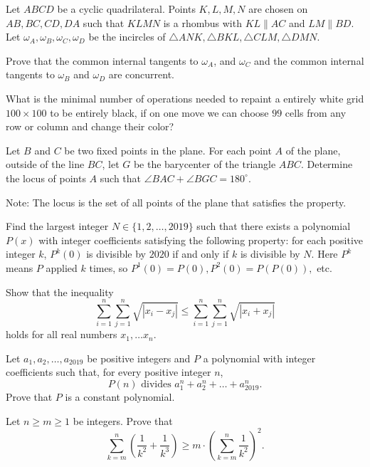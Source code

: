 \documentclass[11pt]{scrartcl}
\begin{document}
\begin{problem}[5299971832672937326]
Let $ABCD$ be a cyclic quadrilateral. Points $K, L, M, N$ are chosen on $AB, BC, CD, DA$ such that $KLMN$ is a rhombus with $KL \parallel AC$ and $LM \parallel BD$. Let $\omega_A, \omega_B, \omega_C, \omega_D$ be the incircles of $\triangle ANK, \triangle BKL, \triangle CLM, \triangle DMN$.

Prove that the common internal tangents to $\omega_A$, and $\omega_C$ and the common internal tangents to $\omega_B$ and $\omega_D$ are concurrent.
\end{problem}
\begin{problem}[549441013338848]
	What is the minimal number of operations needed to repaint a entirely white grid $100 \times 100$ to be entirely black, if on one move we can choose $99$ cells from any row or column and change their color?
\end{problem}
\begin{problem}[2143833415170817930]
Let $B$ and $C$ be two fixed points in the plane. For each point $A$ of the plane, outside of the line $BC$, let $G$ be the barycenter of the triangle $ABC$. Determine the locus of points $A$ such that $\angle BAC + \angle BGC = 180^{\circ}$.

Note: The locus is the set of all points of the plane that satisfies the property.
\end{problem}
\begin{problem}[4037864050528368034]
Find the largest integer $N \in \{1, 2, \ldots , 2019 \}$ such that there exists a polynomial $P(x)$ with integer coefficients satisfying the following property: for each positive integer $k$, $P^k(0)$ is divisible by $2020$ if and only if $k$ is divisible by $N$. Here $P^k$ means $P$ applied $k$ times, so $P^1(0)=P(0), P^2(0)=P(P(0)),$ etc.
\end{problem}
\begin{problem}[952584318797289]
Show that the inequality\[\sum_{i=1}^n \sum_{j=1}^n \sqrt{|x_i-x_j|}\leqslant \sum_{i=1}^n \sum_{j=1}^n \sqrt{|x_i+x_j|}\]holds for all real numbers $x_1,\ldots x_n.$
\end{problem}
\begin{problem}[247248446755838]
	Let $a_1, a_2, \dots, a_{2019}$ be positive integers and $P$ a polynomial with integer coefficients such that, for every positive integer $n$,
$$P(n) \text{ divides  } a_1^n+a_2^n+\dots+a_{2019}^n.$$Prove that $P$ is a constant polynomial.
\end{problem}
\begin{problem}[4479133443678014025]
Let $n\ge m\ge 1$ be integers. Prove that
\[\sum_{k=m}^n \left (\frac 1{k^2}+\frac 1{k^3}\right) \ge m\cdot \left(\sum_{k=m}^n \frac 1{k^2}\right)^2.\]
\end{problem}
\end{document}
